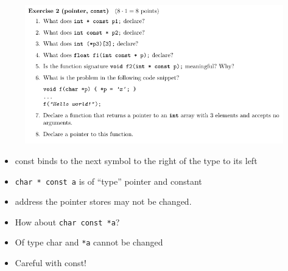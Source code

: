 \documentclass[10pt]{beamer}
\begin{document}
\begin{frame}{}
  \begin{figure}
          \includegraphics[keepaspectratio, width=\textwidth, height=\textheight-2\baselineskip-2\baselineskip]{img/ex6_101.png} \\
        \end{figure}
        \begin{itemize}
         \item const binds to the next symbol to the right of the type to its left
         \item \texttt{char * const a} is of "`type"' pointer and constant 
         \item address the pointer stores may not be changed.
         \item How about \texttt{char const *a}? 
         \item Of type char and \texttt{*a} cannot be changed \\
         \item Careful with const!
         \end{itemize}
        \framebreak
        

\end{frame}
\end{document}
